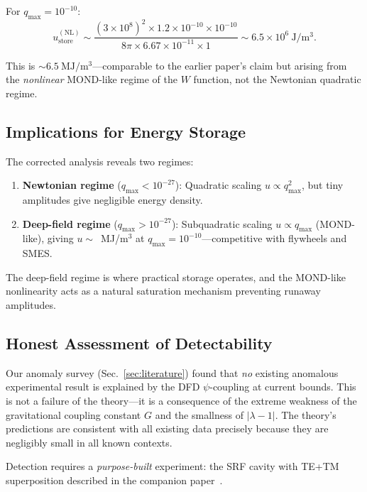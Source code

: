 \documentclass[aps,prd,twocolumn,showpacs,preprintnumbers,superscriptaddress,nofootinbib]{revtex4-2}
\newcommand{\Wfunc}{W}
\begin{document}
For $q_{\max} = 10^{-10}$:
\begin{equation}
u_{\mathrm{store}}^{(\mathrm{NL})} \sim \frac{(3\times 10^8)^2\times 1.2\times 10^{-10}\times 10^{-10}}{8\pi\times 6.67\times 10^{-11}\times 1}
  \sim 6.5\times 10^{6}~\mathrm{J/m^3}.
\end{equation}

This is $\sim 6.5~\mathrm{MJ/m^3}$---comparable to the earlier paper's
claim but arising from the \emph{nonlinear} MOND-like regime of the
$\Wfunc$ function, not the Newtonian quadratic regime.

\subsection{Implications for Energy Storage}\label{sec:implications}

The corrected analysis reveals two regimes:

\begin{enumerate}
\item \textbf{Newtonian regime} ($q_{\max} < 10^{-27}$): Quadratic
scaling $u \propto q_{\max}^2$, but tiny amplitudes give negligible
energy density.

\item \textbf{Deep-field regime} ($q_{\max} > 10^{-27}$): Subquadratic
scaling $u \propto q_{\max}$ (MOND-like), giving $u \sim$~MJ/m$^3$
at $q_{\max} = 10^{-10}$---competitive with flywheels and SMES.
\end{enumerate}

The deep-field regime is where practical storage operates, and the
MOND-like nonlinearity acts as a natural saturation mechanism
preventing runaway amplitudes.

\subsection{Honest Assessment of Detectability}\label{sec:honest}

Our anomaly survey (Sec.~\ref{sec:literature}) found that \emph{no}
existing anomalous experimental result is explained by the DFD
$\psi$-coupling at current bounds.  This is not a failure of the
theory---it is a consequence of the extreme weakness of the
gravitational coupling constant $G$ and the smallness of
$|\lambda-1|$.  The theory's predictions are consistent with all
existing data precisely because they are negligibly small in all
known contexts.

Detection requires a \emph{purpose-built} experiment: the SRF cavity
with TE+TM superposition described in the companion
paper~\cite{Alcock2025Harvest}.
\end{document}
